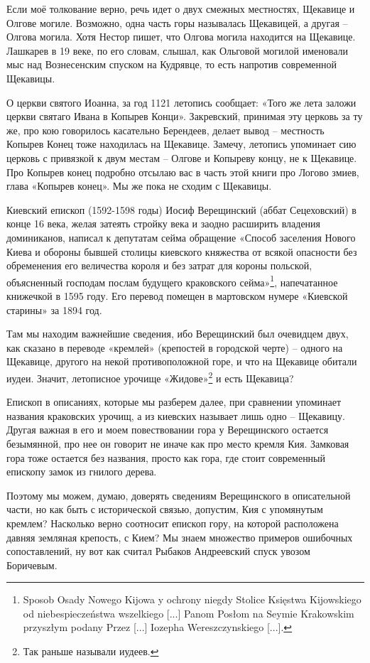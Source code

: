 Если моё толкование верно, речь идет о двух смежных местностях, Щекавице и Олгове могиле. Возможно, одна часть горы называлась Щекавицей, а другая – Олгова могила. Хотя Нестор пишет, что Олгова могила находится на Щекавице. Лашкарев в 19 веке, по его словам, слышал, как Ольговой могилой именовали мыс над Вознесенским спуском на Кудрявце, то есть напротив современной Щекавицы.

О церкви святого Иоанна, за год 1121 летопись сообщает: «Того же лета заложи церкви святаго Ивана в Копырев Конци». Закревский, принимая эту церковь за ту же, про кою говорилось касательно Берендеев, делает вывод – местность Копырев Конец тоже находилась на Щекавице. Замечу, летопись упоминает сию церковь с привязкой к двум местам – Олгове и Копыреву концу, не к Щекавице. Про Копырев конец подробно отсылаю вас в часть этой книги про Логово змиев, глава «Копырев конец». Мы же пока не сходим с Щекавицы.

Киевский епископ (1592-1598 годы) Иосиф Верещинский (аббат Сецеховский) в конце 16 века, желая затеять стройку века и заодно расширить владения доминиканов, написал к депутатам сейма обращение «Способ заселения Нового Киева и обороны бывшей столицы киевского княжества от всякой опасности без обременения его величества короля и без затрат для короны польской, объясненный господам послам будущего краковского сейма»\footnote{Sposob Osady Nowego Kijowa y ochrony niegdy Stolice Księstwa Kijowskiego od niebespieczeństwa wszelkiego [...] Panom Posłom na Seymie Krakowskim przyszłym podany Przez [...] Iozepha Wereszczynskiego [...].}, напечатанное книжечкой в 1595 году. Его перевод помещен в мартовском нумере «Киевской старины» за 1894 год.

Там мы находим важнейшие сведения, ибо Верещинский был очевидцем двух, как сказано в переводе «кремлей» (крепостей в городской черте) – одного на Щекавице, другого на некой противоположной горе, и что на Щекавице обитали иудеи. Значит, летописное урочище «Жидове»\footnote{Так раньше называли иудеев.} и есть Щекавица?

Епископ в описаниях, которые мы разберем далее, при сравнении упоминает названия краковских урочищ, а из киевских называет лишь одно – Щекавицу. Другая важная в его и моем повествовании гора у Верещинского остается безымянной, про нее он говорит не иначе как про место кремля Кия. Замковая гора тоже остается без названия, просто как гора, где стоит современный епископу замок из гнилого дерева.

Поэтому мы можем, думаю, доверять сведениям Верещинского в описательной части, но как быть с исторической связью, допустим, Кия с упомянутым кремлем? Насколько верно соотносит епископ гору, на которой расположена давняя земляная крепость, с Кием? Мы знаем множество примеров ошибочных сопоставлений, ну вот как считал Рыбаков Андреевский спуск увозом Боричевым.

